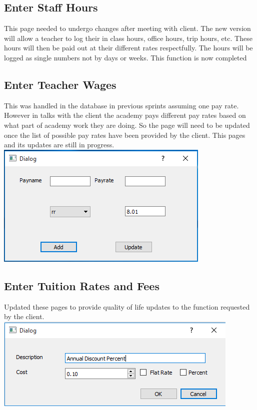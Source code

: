 \subsection{Enter Staff Hours}
This page needed to undergo changes after meeting with client. The new version will allow a teacher to log their in class hours, office hours, trip hours, etc. These hours will then be paid out at their different rates respectfully. The hours will be logged as single numbers not by days or weeks. This function is now completed

\subsection{Enter Teacher Wages}
This was handled in the database in previous sprints assuming one pay rate. However in talks with the client the academy pays different pay rates based on what part of academy work they are doing. So the page will need to be updated once the list of possible pay rates have been provided by the client. This pages and its updates are still in progress. \\

\includegraphics[scale=0.5]{payRates.png}

\subsection{Enter Tuition Rates and Fees}
Updated these pages to provide quality of life updates to the function requested by the client.\\

\includegraphics[scale=0.5]{feeDialog.png}


